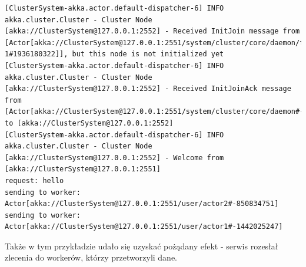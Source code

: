 \documentclass[12pt]{article}
\begin{document}
\begin{verbatim}
[ClusterSystem-akka.actor.default-dispatcher-6] INFO akka.cluster.Cluster - Cluster Node [akka://ClusterSystem@127.0.0.1:2552] - Received InitJoin message from [Actor[akka://ClusterSystem@127.0.0.1:2551/system/cluster/core/daemon/firstSeedNodeProcess-1#1936180322]], but this node is not initialized yet
[ClusterSystem-akka.actor.default-dispatcher-6] INFO akka.cluster.Cluster - Cluster Node [akka://ClusterSystem@127.0.0.1:2552] - Received InitJoinAck message from [Actor[akka://ClusterSystem@127.0.0.1:2551/system/cluster/core/daemon#-1857672861]] to [akka://ClusterSystem@127.0.0.1:2552]
[ClusterSystem-akka.actor.default-dispatcher-6] INFO akka.cluster.Cluster - Cluster Node [akka://ClusterSystem@127.0.0.1:2552] - Welcome from [akka://ClusterSystem@127.0.0.1:2551]
request: hello
sending to worker: Actor[akka://ClusterSystem@127.0.0.1:2551/user/actor2#-850834751]
sending to worker: Actor[akka://ClusterSystem@127.0.0.1:2551/user/actor1#-1442025247]
\end{verbatim}

Także w tym przykładzie udało się uzyskać pożądany efekt - serwis rozesłał zlecenia do workerów, którzy przetworzyli dane.
\end{document}
